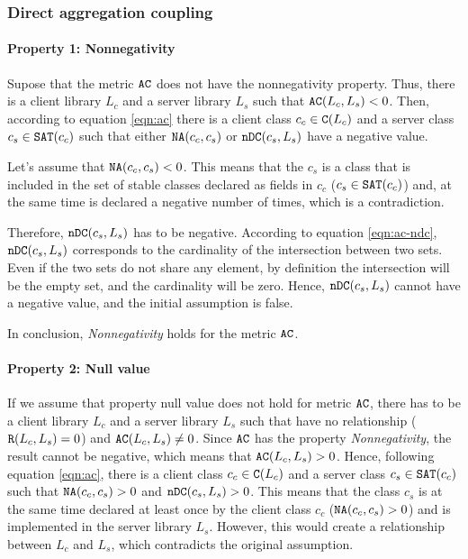 \subsubsection{Direct aggregation coupling}

\paragraph{Property 1: Nonnegativity}
Supose that the metric $\verb|AC|$ does not have the nonnegativity property. Thus, there is a client library $L_c$ and a server library $L_s$ such that $\verb|AC|(L_c, L_s) < 0$. Then, according to equation \ref{eqn:ac} there is a client class $c_c \in \verb|C|(L_c)$ and a server class $c_s \in \verb|SAT|(c_c)$ such that either $\verb|NA|(c_c, c_s)$ or $\verb|nDC|(c_s, L_s)$ have a negative value.

Let's assume that $\verb|NA|(c_c, c_s) < 0$. This means that the $c_s$ is a class that is included in the set of stable classes declared as fields in $c_c$ ($c_s \in \verb|SAT|(c_c)$) and, at the same time is declared a negative number of times, which is a contradiction.

Therefore, $\verb|nDC|(c_s, L_s)$ has to be negative. According to equation \ref{eqn:ac-ndc}, $\verb|nDC|(c_s, L_s)$ corresponds to the cardinality of the intersection between two sets. Even if the two sets do not share any element, by definition the intersection will be the empty set, and the cardinality will be zero. Hence, $\verb|nDC|(c_s, L_s)$ cannot have a negative value, and the initial assumption is false.

In conclusion, \textit{Nonnegativity} holds for the metric $\verb|AC|$.

\paragraph{Property 2: Null value}
If we assume that property null value does not hold for metric $\verb|AC|$, there has to be a client library $L_c$ and a server library $L_s$ such that have no relationship ($\verb|R|(L_c, L_s) = 0$) and $\verb|AC|(L_c, L_s)	\neq 0$. Since $\verb|AC|$ has the property \textit{Nonnegativity}, the result cannot be negative, which means that $\verb|AC|(L_c, L_s) > 0$. Hence, following equation \ref{eqn:ac}, there is a client class $c_c \in \verb|C|(L_c)$ and a server class $c_s \in \verb|SAT|(c_c)$ such that $\verb|NA|(c_c, c_s) > 0$ and $\verb|nDC|(c_s, L_s) > 0$. This means that the class $c_s$ is at the same time declared at least once by the client class $c_c$ ($\verb|NA|(c_c, c_s) > 0$) and is implemented in the server library $L_s$. However, this would create a relationship between $L_c$ and $L_s$, which contradicts the original assumption.


